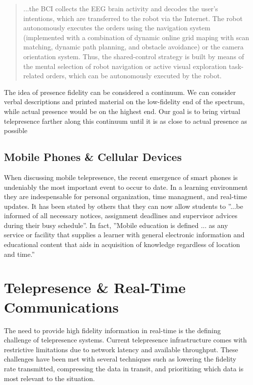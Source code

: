\documentclass[a4paper,12pt]{report}
\begin{document}
\begin{quotation}{
	...the BCI collects the EEG brain activity and decodes the user's intentions, which are transferred to the robot via the Internet. The robot autonomously executes the orders using the navigation system (implemented with a combination of dynamic online grid maping with scan matching, dynamic path planning, and obstacle avoidance) or the camera orientation system. Thus, the shared-control strategy is built by means  of the mental selection of robot navigation or active visual exploration task-related orders, which can be autonomously executed by the robot.}
	\begin{flushright}
		\cite{6104414}
	\end{flushright}
\end{quotation}


The idea of presence fidelity can be considered a continuum. We can consider verbal descriptions and printed material on the low-fidelity end of the spectrum, while actual presence would be on the highest end. Our goal is to bring virtual telepresence farther along this continuum until it is as close to actual presence as possible \cite{726589}

\subsection{Mobile Phones \& Cellular Devices} When discussing mobile telepresence, the recent emergence of smart phones is undeniably the most important event to occur to date. In a learning environment they are indespensable for personal organization, time managment, and real-time updates. It has been stated by others that they can now allow students to ''...be informed of all necessary notices, assignment deadlines and supervisor advices during their busy schedule''. In fact, ''Mobile education is defined ... as any service or facility that supplies a learner with general electronic information and educational content that aids in acquisition of knowledge regardless of location and time.'' \cite{4469080,6007847}

\section{Telepresence \& Real-Time Communications}

The need to provide high fidelity information in real-time is the defining challenge of telepresence systems. Current telepresence infrastructure comes with restrictive limitations due to network latency and available throughput. These challenges have been met with several techniques such as lowering the fidelity rate transmitted, compressing the data in transit, and prioritizing which data is most relevant to the situation.
\end{document}
